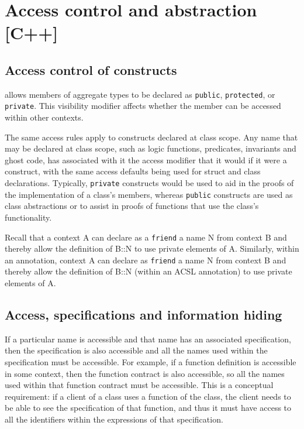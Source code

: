 \section{Access control and abstraction [C++]}
\label{sec:access}


\subsection{Access control of \NAME{} constructs}

\lang{} allows members of aggregate types to be declared as \lstinline|public|, \lstinline|protected|, or \lstinline|private|. This visibility modifier affects whether the member can be accessed within other contexts. 

The same access rules apply to \NAME{} constructs declared at class scope. Any name that may be declared at class scope, such as logic functions, predicates, invariants and ghost code, has associated with it the access modifier that it would if it were a \lang{}
construct, with the same access defaults being used for struct and class declarations. Typically, \lstinline|private| \NAME{}
constructs would be used to aid in the proofs of the implementation of a class's members, whereas 
\lstinline|public| \NAME{} constructs are used as class abstractions or to assist in proofs of functions that use the class's
functionality.

Recall that a \lang{} context A can declare as a \lstinline|friend| a name N from context B and thereby allow 
the definition of B::N to use private elements of A. Similarly, within an \NAME{} annotation, context A can declare as
\lstinline|friend| a \NAME{} name N from context B and thereby allow 
the definition of B::N (within an ACSL annotation) to use private elements of A.

 
\subsection{Access, specifications and information hiding}

If a particular \lang{} name is accessible and that name has an associated \NAME{} specification, then the specification is also accessible and all the names used within the specification must be
accessible. For example, if a function definition is accessible in some context, then the function contract is also accessible, so all the 
names used within that function contract must be accessible. This is a conceptual requirement: if a client of a class uses a function of the class, the client needs to be able to see the specification of that function, and thus it must have access to all the identifiers 
within the expressions of that specification.

